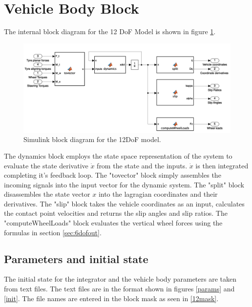 \section{Vehicle Body Block}
\label{sec:bodyblock}
The internal block diagram for the 12 DoF Model is shown in figure \ref{12diag}.
\begin{figure}[ht]
    \centering
    \includegraphics[width=\textwidth]{images/12dofinside.png}
    \caption{Simulink block diagram for the 12DoF model.}
    \label{12diag}
\end{figure}
The dynamics block employs the state space representation of the system to evaluate the state derivative $\dot x$ from the state and the inputs. $\dot x$ is then integrated completing it's feedback loop.
The "tovector" block simply assembles the incoming signals into the input vector for the dynamic system. The "split" block disassembles the state vector $x$ into the lagragian coordinates and their derivatives.
The "slip" block takes the vehicle coordinates as an input, calculates the contact point velocities and returns the slip angles and slip ratios.
The "computeWheelLoads" block evaluates the vertical wheel forces using the formulas in section \ref{sec:6dofout}.

\subsection{Parameters and initial state}
The initial state for the integrator and the vehicle body parameters are taken from text files. The text files are in the format shown in figures \ref{params} and \ref{init}.
The file names are entered in the block mask as seen in \ref{12mask}.

